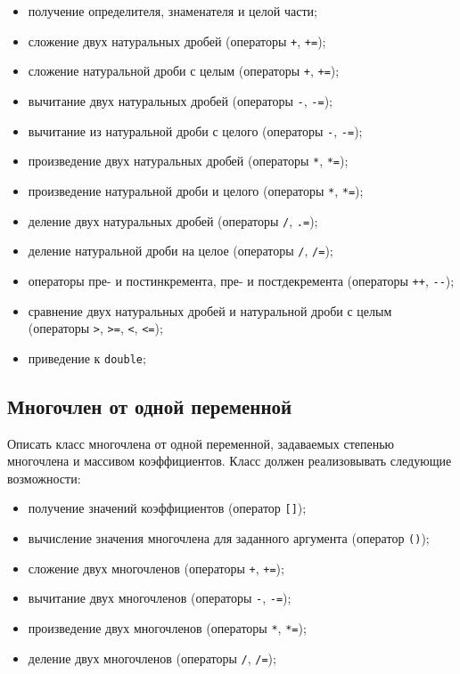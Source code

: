 \documentclass[a4paper,12pt]{article}
\begin{document}
\begin{itemize}
\item получение определителя, знаменателя и целой части;
\item сложение двух натуральных дробей (операторы \lstinline|+|,
  \lstinline|+=|);
\item сложение натуральной дроби с целым (операторы \lstinline|+|,
  \lstinline|+=|);
\item вычитание двух натуральных дробей (операторы \lstinline|-|,
  \lstinline|-=|);
\item вычитание из натуральной дроби с целого (операторы \lstinline|-|,
  \lstinline|-=|);
\item произведение двух натуральных дробей (операторы \lstinline|*|,
  \lstinline|*=|);
\item произведение натуральной дроби и целого (операторы \lstinline|*|,
  \lstinline|*=|);
\item деление двух натуральных дробей (операторы \lstinline|/|,
  \lstinline|.=|);
\item деление натуральной дроби на целое (операторы \lstinline|/|,
  \lstinline|/=|);
\item операторы пре- и постинкремента, пре- и постдекремента
  (операторы \lstinline|++|, \lstinline|--|);
\item сравнение двух натуральных дробей и натуральной дроби с целым
  (операторы \lstinline|>|, \lstinline|>=|, \lstinline|<|,
  \lstinline|<=|);
\item приведение к \lstinline|double|;
\end{itemize}

\subsection{Многочлен от одной переменной}

Описать класс многочлена от одной переменной, задаваемых степенью
многочлена и массивом коэффициентов. Класс должен реализовывать
следующие возможности:

\begin{itemize}
\item получение значений коэффициентов (оператор \lstinline|[]|);
\item вычисление значения многочлена для заданного аргумента (оператор
  \lstinline|()|);
\item сложение двух многочленов (операторы \lstinline|+|,
  \lstinline|+=|);
\item вычитание двух многочленов (операторы \lstinline|-|,
  \lstinline|-=|);
\item произведение двух многочленов (операторы \lstinline|*|,
  \lstinline|*=|);
\item деление двух многочленов (операторы \lstinline|/|,
  \lstinline|/=|);
\end{itemize}
\end{document}
